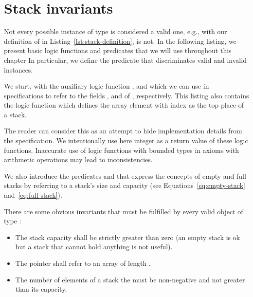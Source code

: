 
\section{Stack invariants}

Not every possible instance of type \stacktype is considered a
valid one, e.g., with our definition of \stacktype in Listing~\ref{lst:stack-definition},
 is not.
In the following listing, we present
basic logic functions and predicates that we will use
throughout this chapter
In particular, we  define the predicate  that
discriminates valid and invalid instances.



We start, with the auxiliary logic function
\StackCapacity, \StackSize and \StackStorage
which we can use in specifications to refer
to the fields ,  and  of \stacktype, respectively.
%
This listing also contains the logic function \StackTop which defines
the array element with index  as the top place of a stack.

The reader can consider this as an attempt to hide
implementation details from
the specification.
%
We intentionally use here integer as a return value of these logic functions.
Inaccurate use of logic functions with bounded types in axioms with
arithmetic operations may lead to inconsistencies.

We also introduce the predicates  and 
that express the concepts of empty and full stacks
by referring to a stack's size and capacity (see Equations~\eqref{eq:empty-stack}
and~\eqref{eq:full-stack}).

There are some obvious invariants that must be fulfilled by every
valid object of type \stacktype:
\begin{itemize}
\item The stack capacity shall be strictly greater than zero
      (an empty stack is ok but a stack that cannot hold anything is not useful).

\item The pointer  shall refer to an array of length .

\item The number of elements  of a stack the must
      be non-negative and not greater than its capacity.
\end{itemize}

